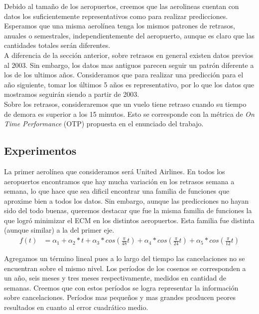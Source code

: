 Debido al tamaño de los aeropuertos, creemos que las aerolineas cuentan con datos los suficientemente representativos como para realizar predicciones. Esperamos que una misma aerolínea tenga los mismos patrones de retrasos, anuales o semestrales, independientemente del aeropuerto, aunque es claro que las cantidades totales serán diferentes. \\

A diferencia de la sección anterior, sobre retrasos en general existen datos previos al 2003. Sin embargo, los datos mas antiguos parecen seguir un patrón diferente a los de los ultimos años. Consideramos que para realizar una predicción para el año siguiente, tomar los últimos 5 años es representativo, por lo que los datos que mostramos seguirán siendo a partir de 2003. \\

Sobre los retrasos, consideraremos que un vuelo tiene retraso cuando su tiempo de demora es superior a los 15 minutos. Esto se corresponde con la métrica de \textit{On Time Performance} (OTP) propuesta en el enunciado del trabajo. \\

\subsection{Experimentos}

La primer aerolínea que consideramos será United Airlines. En todos los aeropuertos encontramos que hay mucha variación en los retrasos semana a semana, lo que hace que sea dificil encontrar una familia de funciones que aproxime bien a todos los datos. Sin embargo, aunque las predicciones no hayan sido del todo buenas, queremos destacar que fue la misma familia de funciones la que logró minimizar el ECM en los distintos aeropuertos. Esta familia fue distinta (aunque similar) a la del primer eje.\\

\begin{align}
f(t) &= \alpha_1 + \alpha_2 * t + \alpha_3 * cos(\frac{\pi}{48} t) + \alpha_4 * cos(\frac{\pi}{24} t) + \alpha_5 * cos(\frac{\pi}{12} t)
\end{align}

Agregamos un término lineal pues a lo largo del tiempo las cancelaciones no se encuentran sobre el mismo nivel. Los períodos de los cosenos se corresponden a un año, seis meses y tres meses respectivamente, medidos en cantidad de semanas. Creemos que con estos períodos se logra representar la información sobre cancelaciones. Períodos mas pequeños y mas grandes producen peores resultados en cuanto al error cuadrático medio. \\

